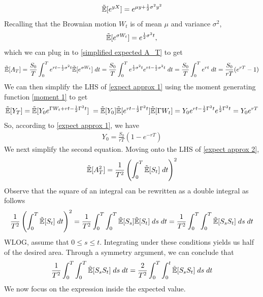 \documentclass[reqno]{amsart}
\newcommand{\rE}[1]{\tilde{\E}[#1]}
\begin{document}
\begin{align} \label{moment 1}
     \rE{e^{yX}}
     = e^{\mu y + \frac{1}{2} \sigma^2 y^2}
\end{align}
Recalling that the Brownian motion $W_t$ is of mean $\mu$ and variance $\sigma^2$, 
\begin{align} 
     \rE{e^{\sigma W_t}}
     = e^{\frac{1}{2}\sigma^2 t},
\end{align}
which we can plug in to \eqref{simplified expected A_T} to get
\begin{align} 
     \rE{A_T}
     = \frac{S_0}{T} \int_0^T e^{rt-\frac{1}{2}\sigma^2t} \rE{e^{\sigma W_t}}  \; dt
     = \frac{S_0}{T} \int_0^T e^{\frac{1}{2}\sigma^2 t} e^{rt-\frac{1}{2}\sigma^2t} \; dt
     = \frac{S_0}{T} \int_0^T e^{rt} \; dt
     = \frac{S_0}{rT} (e^{rT}-1)
\end{align}
We can then simplify the LHS of \eqref{expect approx 1} using the moment generating function \eqref{moment 1} to get
\begin{align} 
     \rE{Y_T} 
     = \rE{Y_0e^{\Gamma W_t+rt-\frac{1}{2}\Gamma^2t}} \;
     = \rE{Y_0} \rE{e^{rt - \frac{1}{2}\Gamma^2t}} \rE{\Gamma W_t}
     = Y_0 e^{rt - \frac{1}{2}\Gamma^2t} e^{\frac{1}{2}\Gamma^2 t}
     = Y_0 e^{rT}
\end{align}
So, according to \eqref{expect approx 1}, we have
\begin{align} \label{calibration 1 r neq 0}
     Y_0 = \frac{S_0}{rT}(1-e^{-rT})
\end{align}
We next simplify the second equation. Moving onto the LHS of \eqref{expect approx 2},
\begin{align}
     \rE{A_T^2}
     = {\frac{1}{T^2} \left(\int_0^T \rE{S_t} \; dt\right)^2}
\end{align}
Observe that the square of an integral can be rewritten as a double integral as follows
\begin{align}
     {\frac{1}{T^2} \left(\int_0^T \rE{S_t} \; dt\right)^2}
     = {\frac{1}{T^2} \int_0^T \int_0^T \rE{S_s} \rE{S_t} \; ds \; dt}
     = {\frac{1}{T^2} \int_0^T \int_0^T \rE{S_s S_t} \; ds \; dt}
\end{align}
WLOG, assume that $0 \leq s \leq t$. Integrating under these conditions yields us half of the desired area. Through a symmetry argument, we can conclude that
\begin{align}
     {\frac{1}{T^2} \int_0^T \int_0^T \rE{S_s S_t} \; ds \; dt}
     = {\frac{2}{T^2} \int_0^T \int_0^t \rE{S_s S_t} \; ds \; dt}
\end{align}
We now focus on the expression inside the expected value. 
\end{document}
